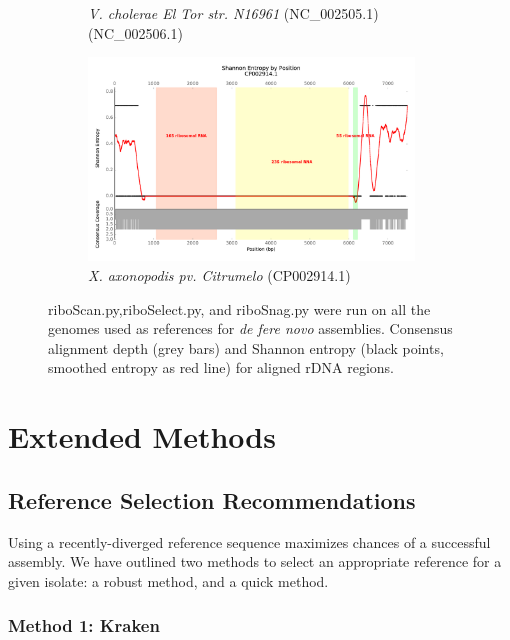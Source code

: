 \documentclass[10pt]{article}
\begin{document}
\begin{figure}
\begin{subfigure}[b]{.45\textwidth}
    \caption{\textit{V. cholerae El Tor str. N16961} (NC\_002505.1) (NC\_002506.1)}
    \label{fig:ent_vib}
  \end{subfigure}
  \begin{subfigure}[b]{.45\textwidth}
    \includegraphics[width=0.95\textwidth]{gage_entropy_figures/CP002914.1_entropy_plot}
    \caption{\textit{X. axonopodis pv. Citrumelo} (CP002914.1)}
  \end{subfigure}
  \caption{riboScan.py,riboSelect.py, and riboSnag.py were run on all the genomes used as references for \textit{de fere novo} assemblies. Consensus alignment depth (grey bars) and Shannon entropy (black points, smoothed entropy as red line) for aligned rDNA regions.}
  \label{fig:ent_gage}

\end{figure}

\pagebreak


\section*{Extended Methods}

\subsection*{Reference Selection Recommendations}
Using a recently-diverged reference sequence maximizes chances of a successful assembly. We have outlined two methods to select an appropriate reference for a given isolate: a robust method, and a quick method.

\subsubsection*{Method 1: Kraken}
\end{document}
